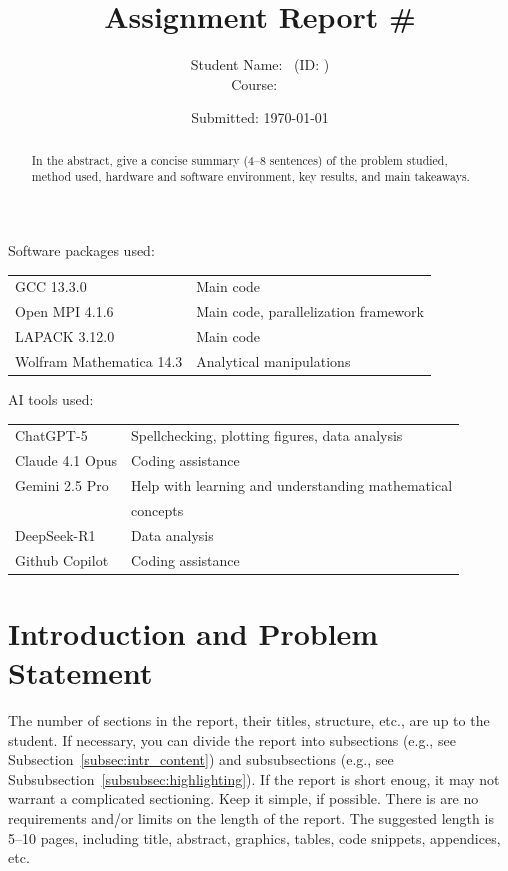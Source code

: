 \documentclass[11pt,a4paper]{article}
\title{Assignment Report \#\assignmentnumber \\ \assignmenttitle}
\author{Student Name: \studentname \ (ID: \studentid) \\ Course: \coursecode \ \coursename
}
\date{Submitted: \today}
\begin{document}
\maketitle

\begin{center}
{Software packages used:} \\
\begin{tabular}{|l|l|}
\hline
GCC 13.3.0               &  Main code \\
Open MPI 4.1.6           &  Main code, parallelization framework \\
LAPACK 3.12.0            &  Main code \\
Wolfram Mathematica 14.3 &  Analytical manipulations \\
\hline
\end{tabular}
\end{center}

\begin{center}
{AI tools used:} \\
\begin{tabular}{|l|l|}
\hline
ChatGPT-5           & Spellchecking, plotting figures, data analysis \\
Claude 4.1 Opus     & Coding assistance \\
Gemini 2.5 Pro      & Help with learning and understanding mathematical \\ 
                    & concepts  \\ 
DeepSeek-R1         & Data analysis \\
Github Copilot      & Coding assistance \\
\hline
\end{tabular}
\end{center}
\vspace{2em}

\begin{abstract}
\noindent
In the abstract, give a concise summary (4--8 sentences) of the problem studied, method used, hardware and software environment, key results, and main takeaways.
\end{abstract}

\section{Introduction and Problem Statement}
The number of sections in the report, their titles, structure, etc., are up to the student.  
If necessary, you can divide the report into subsections (e.g., see Subsection~\ref{subsec:intr_content}) and subsubsections (e.g., see Subsubsection~\ref{subsubsec:highlighting}). If the report is short enoug, it may not warrant a complicated sectioning. Keep it simple, if possible.
There is are no requirements and/or limits on the length of the report. The suggested length is 5--10 pages, including title, abstract, graphics, tables, code snippets, appendices, etc. 
\end{document}
